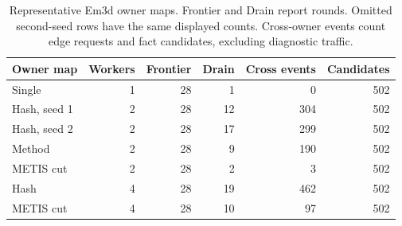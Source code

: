 \begin{table}[t]
\centering
\small
\caption{Representative Em3d owner maps. Frontier and Drain report rounds. Omitted second-seed rows have the same displayed counts. Cross-owner events count edge requests and fact candidates, excluding diagnostic traffic.}
\label{tab:em3d-layouts}
\begin{tabular}{lrrrrr}
\toprule
\textbf{Owner map} & \textbf{Workers} & \textbf{Frontier} & \textbf{Drain} & \textbf{Cross events} & \textbf{Candidates} \\
\midrule
Single & 1 & 28 & 1 & 0 & 502 \\
Hash, seed 1 & 2 & 28 & 12 & 304 & 502 \\
Hash, seed 2 & 2 & 28 & 17 & 299 & 502 \\
Method & 2 & 28 & 9 & 190 & 502 \\
METIS cut & 2 & 28 & 2 & 3 & 502 \\
Hash & 4 & 28 & 19 & 462 & 502 \\
METIS cut & 4 & 28 & 10 & 97 & 502 \\
\bottomrule
\end{tabular}
\end{table}

